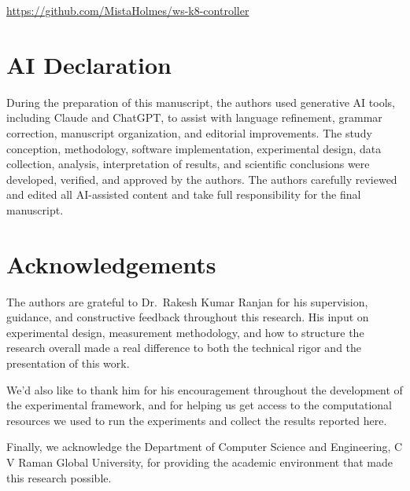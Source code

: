 \documentclass[twocolumn]{svjour3}
\begin{document}
\begin{center}
\url{https://github.com/MistaHolmes/ws-k8-controller}
\end{center}

\section*{AI Declaration}

During the preparation of this manuscript, the authors used generative AI tools,
including Claude and ChatGPT, to assist with language refinement, grammar correction,
manuscript organization, and editorial improvements. The study conception, methodology,
software implementation, experimental design, data collection, analysis, interpretation
of results, and scientific conclusions were developed, verified, and approved by the
authors. The authors carefully reviewed and edited all AI-assisted content and take full
responsibility for the final manuscript.

\section*{Acknowledgements}

The authors are grateful to Dr.\ Rakesh Kumar Ranjan for his supervision,
guidance, and constructive feedback throughout this research. His input on
experimental design, measurement methodology, and how to structure the research
overall made a real difference to both the technical rigor and the presentation of
this work.

We'd also like to thank him for his encouragement throughout the development of
the experimental framework, and for helping us get access to the computational
resources we used to run the experiments and collect the results reported here.

Finally, we acknowledge the Department of Computer Science and Engineering, C V
Raman Global University, for providing the academic environment that made this
research possible.




\end{document}
